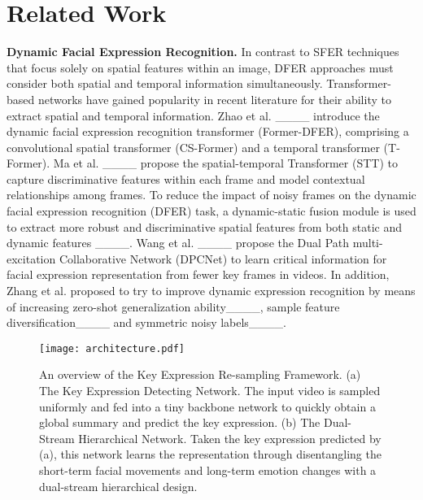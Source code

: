 \section{Related Work}
\label{sec:relat}

\textbf{Dynamic Facial Expression Recognition.} In contrast to SFER techniques that focus solely on spatial features within an image, DFER approaches must consider both spatial and temporal information simultaneously. Transformer-based networks have gained popularity in recent literature for their ability to extract spatial and temporal information. Zhao et al. ____ introduce the dynamic facial expression recognition transformer (Former-DFER), comprising a convolutional spatial transformer (CS-Former) and a temporal transformer (T-Former). Ma et al. ____ propose the spatial-temporal Transformer (STT) to capture discriminative features within each frame and model contextual relationships among frames. To reduce the impact of noisy frames on the dynamic facial expression recognition (DFER) task, a dynamic-static fusion module is used to extract more robust and discriminative spatial features from both static and dynamic features ____. Wang et al. ____ propose the Dual Path multi-excitation Collaborative Network (DPCNet) to learn critical information for facial expression representation from fewer key frames in videos. In addition, Zhang et al. proposed to try to improve dynamic expression recognition by means of increasing zero-shot generalization ability____, sample feature diversification____ and symmetric noisy labels____.


\begin{figure*}[ht!]
  \centering
  \texttt{[image: architecture.pdf]}

  \caption{An overview of the Key Expression Re-sampling Framework. (a) The Key Expression Detecting Network. The input video is sampled uniformly and fed into a tiny backbone network to quickly obtain a global summary and predict the key expression. (b) The Dual-Stream Hierarchical Network. Taken the key expression predicted by (a), this network learns the representation through disentangling the short-term facial movements and long-term emotion changes with a dual-stream hierarchical design. }
  \label{fig:architecture}
\end{figure*}

